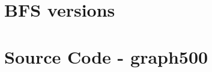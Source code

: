 \documentclass[12pt,a4paper]{article}
\begin{document}
\section{BFS versions}
\label{sec:versions}



\section{Source Code - graph500}
\label{sec:sourcecode}

\clearpage

\clearpage


\clearpage
\end{document}
